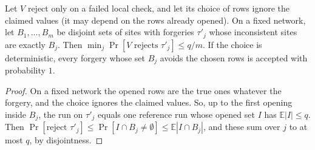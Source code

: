 \begin{proposition}
\label{prop:blind}
Let $V$ reject only on a failed local check, and let its choice of rows ignore the claimed values
(it may depend on the rows already opened). On a fixed network, let $B_1,\dots,B_m$ be disjoint
sets of sites with forgeries $\tau'_j$ whose inconsistent sites are exactly $B_j$. Then
$\min_j\Pr[V\text{ rejects }\tau'_j]\le q/m$. If the choice is deterministic, every forgery whose
set $B_j$ avoids the chosen rows is accepted with probability $1$.
\end{proposition}
\begin{proof}
On a fixed network the opened rows are the true ones whatever the forgery, and the choice ignores
the claimed values. So, up to the first opening inside $B_j$, the run on $\tau'_j$ equals one
reference run whose opened set $I$ has $\mathbb E|I|\le q$. Then
$\Pr[\text{reject }\tau'_j]\le\Pr[I\cap B_j\neq\emptyset]\le\mathbb E|I\cap B_j|$, and these sum
over $j$ to at most $q$, by disjointness.
\end{proof}

